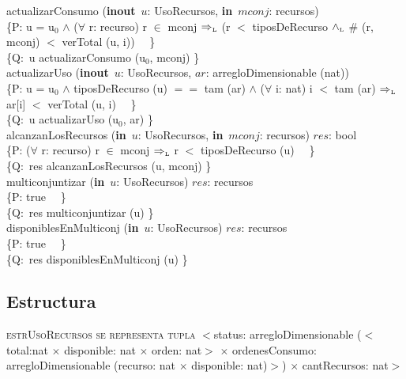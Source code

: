 \documentclass[a4paper,10pt]{article}
\begin{document}
\noindent actualizarConsumo (\textbf{inout}\ $u$: UsoRecursos, \textbf{in}\ $mconj$: recursos) \ \ \ \ \ \\
\indent \{P: u = u$_0$ $\wedge$ ($\forall$ r: recurso) r $\in$ mconj $\Rightarrow_{\mathrm{\scriptscriptstyle{L}}}$ (r $<$ tiposDeRecurso $\land_{\mathrm{\scriptscriptstyle{L}}}$ $\#$ (r, mconj) $<$ verTotal (u, i)) \ \ \}  \\
\indent \{Q:\ u \igobs actualizarConsumo (u$_0$, mconj) \}\\

\noindent actualizarUso (\textbf{inout}\ $u$: UsoRecursos, $ar$: arregloDimensionable (nat)) \ \ \ \ \ \\
\indent \{P: u = u$_0$ $\wedge$ tiposDeRecurso (u) $==$ tam (ar) $\wedge$ ($\forall$ i: nat) i $<$ tam (ar) $\Rightarrow_{\mathrm{\scriptscriptstyle{L}}}$ ar[i] $<$ verTotal (u, i) \ \ \}  \\
\indent \{Q:\ u \igobs actualizarUso (u$_0$, ar) \}\\

\noindent alcanzanLosRecursos (\textbf{in}\ $u$: UsoRecursos, \textbf{in}\ $mconj$: recursos) \en $res$: bool \ \ \ \ \ \\
\indent \{P: ($\forall$ r: recurso) r $\in$ mconj $\Rightarrow_{\mathrm{\scriptscriptstyle{L}}}$ r $<$ tiposDeRecurso (u) \ \ \}  \\
\indent \{Q:\ res \igobs alcanzanLosRecursos (u, mconj) \}\\

\noindent multiconjuntizar (\textbf{in}\ $u$: UsoRecursos) \en $res$: recursos \ \ \ \ \ \\
\indent \{P: true \ \ \}  \\
\indent \{Q:\ res \igobs multiconjuntizar (u) \}\\

\noindent disponiblesEnMulticonj (\textbf{in}\ $u$: UsoRecursos) \en $res$: recursos \ \ \ \ \ \\
\indent \{P: true \ \ \}  \\
\indent \{Q:\ res \igobs disponiblesEnMulticonj (u) \}\\

\newpage
\subsection{Estructura}

    \noindent \textsc{estrUsoRecursos se representa tupla} $<$status: arregloDimensionable ($<$total:nat $\times$ disponible: nat $\times$ orden: nat$>$ $\times$ ordenesConsumo: arregloDimensionable (recurso: nat $\times$ disponible: nat)$>$) $\times$ cantRecursos: nat$>$\\
\end{document}
